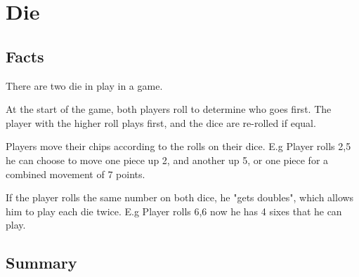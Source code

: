 \section{Die}

\subsection{Facts}

\begin{dashed}
    \item There are two die in play in a game.
    \item At the start of the game, both players roll to determine who goes first.
    The player with the higher roll plays first, and the dice are re-rolled if equal.
    \item Players move their chips according to the rolls on their dice.
    E.g Player rolls 2,5 he can choose to move one piece up 2, and another up 5,
    or one piece for a combined movement of 7 points.
    \item If the player rolls the same number on both dice, he "gets doubles", which
    allows him to play each die twice.
    E.g Player rolls 6,6 now he has 4 sixes that he can play.
    \item
\end{dashed}

\subsection{Summary}

